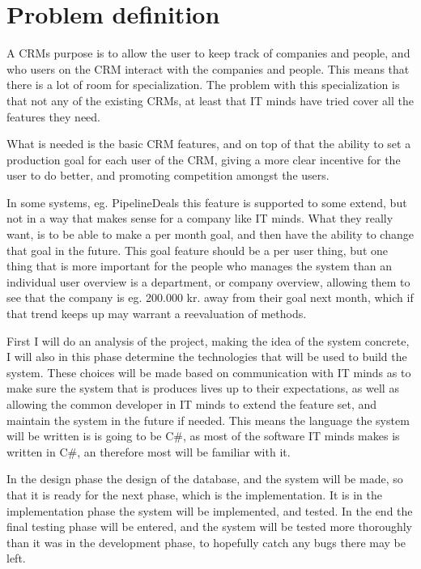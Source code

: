 \section{Problem definition}
\label{sec:Problem definition}
A CRMs purpose is to allow the user to keep track of companies and people, and who users on the CRM interact with the companies and people. This means that there is a lot of room for specialization. The problem with this specialization is that not any of the existing CRMs, at least that IT minds have tried cover all the features they need.

What is needed is the basic CRM features, and on top of that the ability to set a production goal for each user of the CRM, giving a more clear incentive for the user to do better, and promoting competition amongst the users.

In some systems, eg. PipelineDeals\cite{pipelinedeals:features} this feature is supported to some extend, but not in a way that makes sense for a company like IT minds. What they really want, is to be able to make a per month goal, and then have the ability to change that goal in the future. This goal feature should be a per user thing, but one thing that is more important for the people who manages the system than an individual user overview is a department, or company overview, allowing them to see that the company is eg. 200.000 kr. away from their goal next month, which if that trend keeps up may warrant a reevaluation of methods.

First I will do an analysis of the project, making the idea of the system concrete, I will also in this phase determine the technologies that will be used to build the system. These choices will be made based on communication with IT minds as to make sure the system that is produces lives up to their expectations, as well as allowing the common developer in IT minds to extend the feature set, and maintain the system in the future if needed. This means the language the system will be written is is going to be C\#, as most of the software IT minds makes is written in C\#, an therefore most will be familiar with it.

In the design phase the design of the database, and the system will be made, so that it is ready for the next phase, which is the implementation. It is in the implementation phase the system will be implemented, and tested. In the end the final testing phase will be entered, and the system will be tested more thoroughly than it was in the development phase, to hopefully catch any bugs there may be left.

